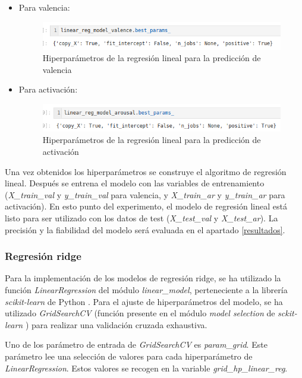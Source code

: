 \documentclass[12pt,a4paper,Spanish]{article}
\begin{document}
\begin{itemize}
	\item Para valencia:
	\begin{figure}[H]
		\centering
		\includegraphics[width=0.7\linewidth]{figs/final_params_linear_valence}
		\caption{Hiperparámetros de la regresión lineal para la predicción de valencia}
		\label{fig:finalparamslinearvalence}
	\end{figure}
	\item Para activación:
	\begin{figure}[H]
		\centering
		\includegraphics[width=0.7\linewidth]{figs/final_params_linear_arousal}
		\caption{Hiperparámetros de la regresión lineal para la predicción de activación}
		\label{fig:finalparamslineararousal}
	\end{figure}
\end{itemize}
Una vez obtenidos los hiperparámetros se construye el algoritmo de regresión lineal. Después se entrena el modelo con las variables de entrenamiento (\textit{X\_train\_val} y \textit{y\_train\_val} para valencia, y \textit{X\_train\_ar} y \textit{y\_train\_ar} para activación).
\newline
En esto punto del experimento, el modelo de regresión lineal está listo para ser utilizado con los datos de test (\textit{X\_test\_val} y \textit{X\_test\_ar}). La precisión y la fiabilidad del modelo será evaluada en el apartado \ref{resultados}.
\subsubsection{Regresión ridge}
Para la implementación de los modelos de regresión ridge, se ha utilizado la función \textit{LinearRegression} del módulo \textit{linear\_model}, perteneciente a la librería \textit{scikit-learn} de Python \cite{scikit-learn}.
\newline
Para el ajuste de hiperparámetros del modelo, se ha utilizado \textit{GridSearchCV} (función presente en el módulo \textit{model selection} de \textit{sckit-learn} \cite{scikit-learn}) para realizar una validación cruzada exhaustiva.

Uno de los parámetro de entrada de \textit{GridSearchCV} es \textit{param\_grid}. Este parámetro lee una selección de valores para cada hiperparámetro de \textit{LinearRegression}. Estos valores se recogen en la variable \textit{grid\_hp\_linear\_reg}.
\end{document}
